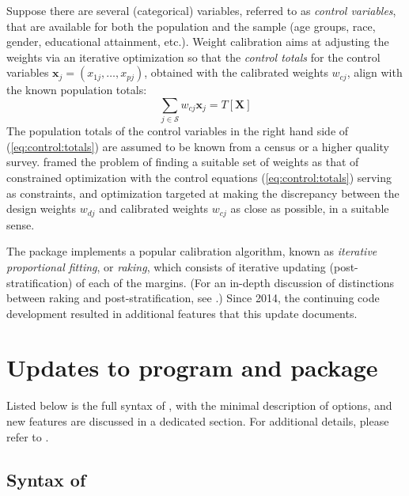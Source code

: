 Suppose there are several (categorical) variables, referred to
as {\it control variables}, that are available for both
the population and the sample
(age groups, race, gender, educational attainment, etc.).
Weight calibration aims at adjusting the weights
via an iterative optimization
so that the {\it control totals} for the control variables
$\mathbf{x}_j=(x_{1j}, \ldots, x_{pj})$, obtained with the calibrated
weights $w_{cj}$, align with the known population totals:
\begin{equation}
    \sum_{j \in \mathcal{S}} w_{cj} \mathbf{x}_j
    = T [ \mathbf{X}  ]
    \label{eq:control:totals}
\end{equation}
The population totals of the control variables in the right hand side
of (\ref{eq:control:totals}) are assumed to be known from a census or a higher quality survey.
\citet{deville:sarndal:1992} framed the problem of finding a suitable
set of weights as that of constrained optimization with the control
equations (\ref{eq:control:totals}) serving as constraints,
and optimization targeted at making the discrepancy between
the design weights $w_{dj}$ and calibrated weights
$w_{cj}$ as close as possible, in a suitable sense.

The package  \citep{kolenikov:2014} implements
a popular calibration algorithm, known as \textit{iterative proportional fitting},
or \textit{raking}, which consists of iterative updating (post-stratification) of
each of the margins. (For an in-depth discussion of distinctions between
raking and post-stratification, see \citet{kolenikov:2016}.)
Since 2014, the continuing code development resulted
in additional features that this update documents.


\section{Updates to  program and package}

Listed below is the full syntax of , with the minimal description of options, 
and new features are discussed in a dedicated section. For additional details,
please refer to \citet{kolenikov:2014}.

\subsection{Syntax of }
\label{subsec:syntax}

